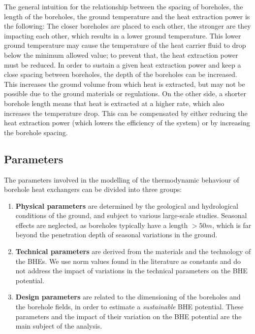 The general intuition for the relationship between the spacing of boreholes, the length of the boreholes, the ground temperature and the heat extraction power is the following:
The closer boreholes are placed to each other, the stronger are they impacting each other, which results in a lower ground temperature. 
This lower ground temperature may cause the temperature of the heat carrier fluid to drop below the minimum allowed value; to prevent that, the heat extraction power must be reduced. 
In order to sustain a given heat extraction power and keep a close spacing between boreholes, the depth of the boreholes can be increased. This increases the ground volume from which heat is extracted, but may not be possible due to the ground materials or regulations. 
On the other side, a shorter borehole length means that heat is extracted at a higher rate, which also increases the temperature drop. This can be compensated by either reducing the heat extraction power (which lowers the efficiency of the system) or by increasing the borehole spacing.

\subsection{Parameters}
\label{geo_params}
The parameters involved in the modelling of the thermodynamic behaviour of borehole heat exchangers can be divided into three groups: 

\begin{enumerate}
\item \textbf{Physical parameters} are determined by the geological and hydrological conditions of the ground, and subject to various large-scale studies. Seasonal effects are neglected, as boreholes typically have a length $> 50m$, which is far beyond the penetration depth of seasonal variations in the ground.

\item \textbf{Technical parameters} are derived from the materials and the technology of the BHEs. We use norm values found in the literature as constants and do not address the impact of variations in the technical parameters on the BHE potential.

\item \textbf{Design parameters} are related to the dimensioning of the boreholes and the borehole fields, in order to estimate a \textit{sustainable} BHE potential. These parameters and the impact of their variation on the BHE potential are the main subject of the analysis. 
\end{enumerate}

